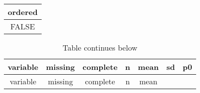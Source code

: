 \documentclass[]{article}
\begin{document}
\begin{longtable}[]{@{}c@{}}
\toprule
\begin{minipage}[b]{0.13\columnwidth}\centering
ordered\strut
\end{minipage}\tabularnewline
\midrule
\endhead
\begin{minipage}[t]{0.13\columnwidth}\centering
FALSE\strut
\end{minipage}\tabularnewline
\bottomrule
\end{longtable}

\begin{longtable}[]{@{}ccccccc@{}}
\caption{Table continues below}\tabularnewline
\toprule
\begin{minipage}[b]{0.30\columnwidth}\centering
variable\strut
\end{minipage} & \begin{minipage}[b]{0.10\columnwidth}\centering
missing\strut
\end{minipage} & \begin{minipage}[b]{0.11\columnwidth}\centering
complete\strut
\end{minipage} & \begin{minipage}[b]{0.08\columnwidth}\centering
n\strut
\end{minipage} & \begin{minipage}[b]{0.07\columnwidth}\centering
mean\strut
\end{minipage} & \begin{minipage}[b]{0.07\columnwidth}\centering
sd\strut
\end{minipage} & \begin{minipage}[b]{0.07\columnwidth}\centering
p0\strut
\end{minipage}\tabularnewline
\midrule
\endfirsthead
\toprule
\begin{minipage}[b]{0.30\columnwidth}\centering
variable\strut
\end{minipage} & \begin{minipage}[b]{0.10\columnwidth}\centering
missing\strut
\end{minipage} & \begin{minipage}[b]{0.11\columnwidth}\centering
complete\strut
\end{minipage} & \begin{minipage}[b]{0.08\columnwidth}\centering
n\strut
\end{minipage} & \begin{minipage}[b]{0.07\columnwidth}\centering
mean\strut
\end{minipage} & \begin{minipage}[b]{0.07\columnwidth}\centering

\end{minipage}
\end{longtable}
\end{document}

